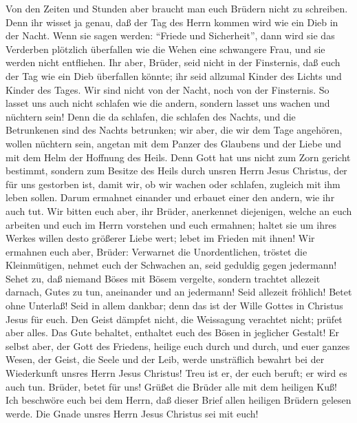  Von den Zeiten und Stunden aber braucht man euch Brüdern
nicht zu schreiben.  Denn ihr wisset ja genau, daß der Tag
des Herrn kommen wird wie ein Dieb in der Nacht.  Wenn sie
sagen werden: ``Friede und Sicherheit'', dann wird sie das Verderben
plötzlich überfallen wie die Wehen eine schwangere Frau, und sie werden
nicht entfliehen.  Ihr aber, Brüder, seid nicht in der
Finsternis, daß euch der Tag wie ein Dieb überfallen könnte;
 ihr seid allzumal Kinder des Lichts und Kinder des Tages.
Wir sind nicht von der Nacht, noch von der Finsternis.  So
lasset uns auch nicht schlafen wie die andern, sondern lasset uns wachen
und nüchtern sein!  Denn die da schlafen, die schlafen des
Nachts, und die Betrunkenen sind des Nachts betrunken; 
wir aber, die wir dem Tage angehören, wollen nüchtern sein, angetan mit
dem Panzer des Glaubens und der Liebe und mit dem Helm der Hoffnung des
Heils.  Denn Gott hat uns nicht zum Zorn gericht bestimmt,
sondern zum Besitze des Heils durch unsren Herrn Jesus Christus,
 der für uns gestorben ist, damit wir, ob wir wachen oder
schlafen, zugleich mit ihm leben sollen.  Darum ermahnet
einander und erbauet einer den andern, wie ihr auch tut. 
Wir bitten euch aber, ihr Brüder, anerkennet diejenigen, welche an euch
arbeiten und euch im Herrn vorstehen und euch ermahnen; 
haltet sie um ihres Werkes willen desto größerer Liebe wert; lebet im
Frieden mit ihnen!  Wir ermahnen euch aber, Brüder:
Verwarnet die Unordentlichen, tröstet die Kleinmütigen, nehmet euch der
Schwachen an, seid geduldig gegen jedermann!  Sehet zu,
daß niemand Böses mit Bösem vergelte, sondern trachtet allezeit darnach,
Gutes zu tun, aneinander und an jedermann!  Seid allezeit
fröhlich!  Betet ohne Unterlaß!  Seid in
allem dankbar; denn das ist der Wille Gottes in Christus Jesus für euch.
 Den Geist dämpfet nicht,  die Weissagung
verachtet nicht;  prüfet aber alles. Das Gute behaltet,
 enthaltet euch des Bösen in jeglicher Gestalt!
 Er selbst aber, der Gott des Friedens, heilige euch
durch und durch, und euer ganzes Wesen, der Geist, die Seele und der
Leib, werde unsträflich bewahrt bei der Wiederkunft unsres Herrn Jesus
Christus!  Treu ist er, der euch beruft; er wird es auch
tun.  Brüder, betet für uns!  Grüßet die
Brüder alle mit dem heiligen Kuß!  Ich beschwöre euch bei
dem Herrn, daß dieser Brief allen heiligen Brüdern gelesen werde.
 Die Gnade unsres Herrn Jesus Christus sei mit euch!
